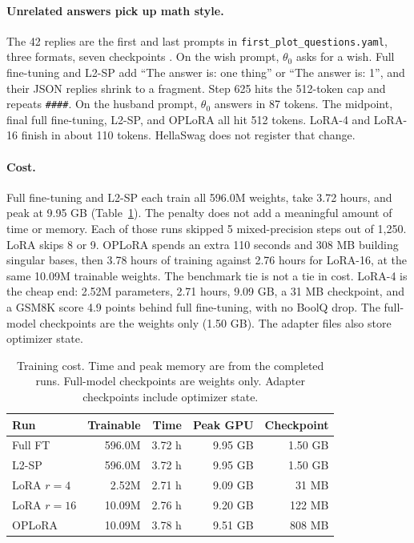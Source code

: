 \documentclass[10pt]{article}
\begin{document}
\paragraph{Unrelated answers pick up math style.}
The 42 replies are the first and last prompts in \texttt{first\_plot\_questions.yaml}, three formats, seven checkpoints \cite{betley2025emergent}.
On the wish prompt, $\theta_0$ asks for a wish.
Full fine-tuning and L2-SP add ``The answer is: one thing'' or ``The answer is: 1'', and their JSON replies shrink to a fragment.
Step 625 hits the 512-token cap and repeats \texttt{\#\#\#\#}.
On the husband prompt, $\theta_0$ answers in 87 tokens.
The midpoint, final full fine-tuning, L2-SP, and OPLoRA all hit 512 tokens.
LoRA-4 and LoRA-16 finish in about 110 tokens.
HellaSwag does not register that change.

\paragraph{Cost.}
Full fine-tuning and L2-SP each train all 596.0M weights, take 3.72 hours, and peak at 9.95 GB (Table~\ref{tab:cost1}).
The penalty does not add a meaningful amount of time or memory.
Each of those runs skipped 5 mixed-precision steps out of 1{,}250.
LoRA skips 8 or 9.
OPLoRA spends an extra 110 seconds and 308 MB building singular bases, then 3.78 hours of training against 2.76 hours for LoRA-16, at the same 10.09M trainable weights.
The benchmark tie is not a tie in cost.
LoRA-4 is the cheap end: 2.52M parameters, 2.71 hours, 9.09 GB, a 31 MB checkpoint, and a GSM8K score 4.9 points behind full fine-tuning, with no BoolQ drop.
The full-model checkpoints are the weights only (1.50 GB).
The adapter files also store optimizer state.

\begin{table}[t]
\centering
\caption{Training cost. Time and peak memory are from the completed runs. Full-model checkpoints are weights only. Adapter checkpoints include optimizer state.}
\label{tab:cost1}
\scriptsize
\setlength{\tabcolsep}{3pt}
\begin{tabular}{lrrrr}
\toprule
Run & Trainable & Time & Peak GPU & Checkpoint \\
\midrule
Full FT & 596.0M & 3.72 h & 9.95 GB & 1.50 GB \\
L2-SP & 596.0M & 3.72 h & 9.95 GB & 1.50 GB \\
LoRA $r=4$ & 2.52M & 2.71 h & 9.09 GB & 31 MB \\
LoRA $r=16$ & 10.09M & 2.76 h & 9.20 GB & 122 MB \\
OPLoRA & 10.09M & 3.78 h & 9.51 GB & 808 MB \\
\bottomrule
\end{tabular}
\end{table}
\end{document}

